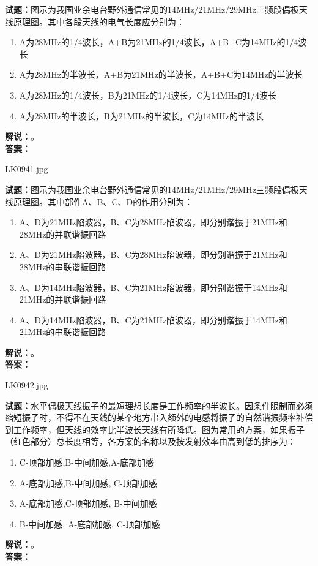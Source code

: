 \documentclass{ctexbook}
\begin{document}
\bigskip

\noindent\textbf{试题：}图示为我国业余电台野外通信常见的14\unit{\MHz}/21\unit{\MHz}/29\unit{\MHz}三频段偶极天线原理图。其中各段天线的电气长度应分别为：
\begin{enumerate}[leftmargin=3em]
  \item A为28\unit{\MHz}的1/4波长，A+B为21\unit{\MHz}的1/4波长，A+B+C为14\unit{\MHz}的1/4波长
  \item A为28\unit{\MHz}的半波长，A+B为21\unit{\MHz}的半波长，A+B+C为14\unit{\MHz}的半波长
  \item A为28\unit{\MHz}的1/4波长，B为21\unit{\MHz}的1/4波长，C为14\unit{\MHz}的1/4波长
  \item A为28\unit{\MHz}的半波长，B为21\unit{\MHz}的半波长，C为14\unit{\MHz}的半波长
\end{enumerate}
\noindent\textbf{解说：}\textbf{}。\\\noindent\textbf{答案：}

\bigskip

LK0941.jpg

\noindent\textbf{试题：}图示为我国业余电台野外通信常见的14\unit{\MHz}/21\unit{\MHz}/29\unit{\MHz}三频段偶极天线原理图。其中部件A、B、C、D的作用分别为：
\begin{enumerate}[leftmargin=3em]
  \item A、D为21\unit{\MHz}陷波器，B、C为28\unit{\MHz}陷波器，即分别谐振于21\unit{\MHz}和28\unit{\MHz}的并联谐振回路
  \item A、D为21\unit{\MHz}陷波器，B、C为28\unit{\MHz}陷波器，即分别谐振于21\unit{\MHz}和28\unit{\MHz}的串联谐振回路
  \item A、D为14\unit{\MHz}陷波器，B、C为21\unit{\MHz}陷波器，即分别谐振于14\unit{\MHz}和21\unit{\MHz}的并联谐振回路
  \item A、D为14\unit{\MHz}陷波器，B、C为21\unit{\MHz}陷波器，即分别谐振于14\unit{\MHz}和21\unit{\MHz}的串联谐振回路
\end{enumerate}
\noindent\textbf{解说：}\textbf{}。\\\noindent\textbf{答案：}

\bigskip

LK0942.jpg

\noindent\textbf{试题：}水平偶极天线振子的最短理想长度是工作频率的半波长。因条件限制而必须缩短振子时，不得不在天线的某个地方串入额外的电感将振子的自然谐振频率补偿到工作频率，但天线的效率比半波长天线有所降低。图为常用的方案，如果振子（红色部分）总长度相等，各方案的名称以及按发射效率由高到低的排序为：
\begin{enumerate}[leftmargin=3em]
  \item C-顶部加感,B-中间加感,A-底部加感
  \item A-底部加感,B-中间加感, C-顶部加感
  \item A-底部加感,C-顶部加感, B-中间加感
  \item B-中间加感, A-底部加感, C-顶部加感
\end{enumerate}
\noindent\textbf{解说：}\textbf{}。\\\noindent\textbf{答案：}
\end{document}
